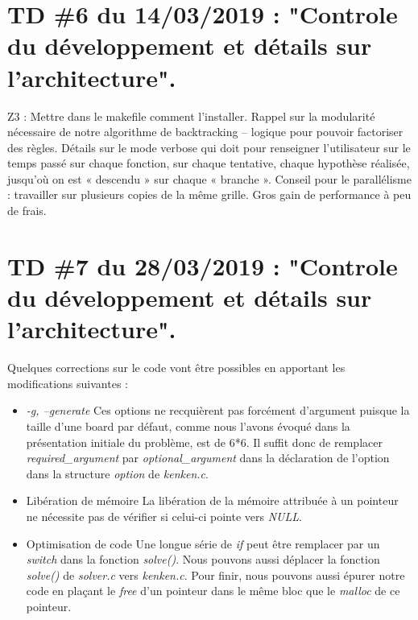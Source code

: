 \documentclass[1]{report}
\begin{document}
    \section{TD \#6 du 14/03/2019 : "Controle du développement et détails sur l'architecture".}

        Z3 : Mettre dans le makefile comment l'installer.
        Rappel sur la modularité nécessaire de notre algorithme de backtracking – logique pour pouvoir
        factoriser des règles.
        Détails sur le mode verbose qui doit pour renseigner l’utilisateur sur le temps passé sur chaque
        fonction, sur chaque tentative, chaque hypothèse réalisée, jusqu’où on est « descendu » sur chaque
        « branche ».
        Conseil pour le parallélisme : travailler sur plusieurs copies de la même grille. Gros gain de
        performance à peu de frais.

    \section{TD \#7 du 28/03/2019 : "Controle du développement et détails sur l'architecture".}
    
    Quelques corrections sur le code vont être possibles en apportant les modifications suivantes : \newline
    
        \begin{itemize}
            \item{\textit{-g, --generate}}
            Ces options ne recquièrent pas forcément d'argument puisque la taille d'une board par défaut, comme nous l'avons évoqué dans la présentation initiale du problème, est de 6*6. Il suffit donc de remplacer \textit{required\_argument} par \textit{optional\_argument} dans la déclaration de l'option dans la structure \textit{option} de \textit{kenken.c}. \newline
            
            \item{Libération de mémoire} \newline
            La libération de la mémoire attribuée à un pointeur ne nécessite pas de vérifier si celui-ci pointe vers \textit{NULL}. \newline
            
            \item{Optimisation de code} \newline
            Une longue série de \textit{if} peut être remplacer par un \textit{switch} dans la fonction \textit{solve()}. Nous pouvons aussi déplacer la fonction \textit{solve()} de \textit{solver.c} vers \textit{kenken.c}. Pour finir, nous pouvons aussi épurer notre code en plaçant le \textit{free} d'un pointeur dans le même bloc que le \textit{malloc} de ce pointeur. \newline
        \end{itemize}
    
\end{document}
